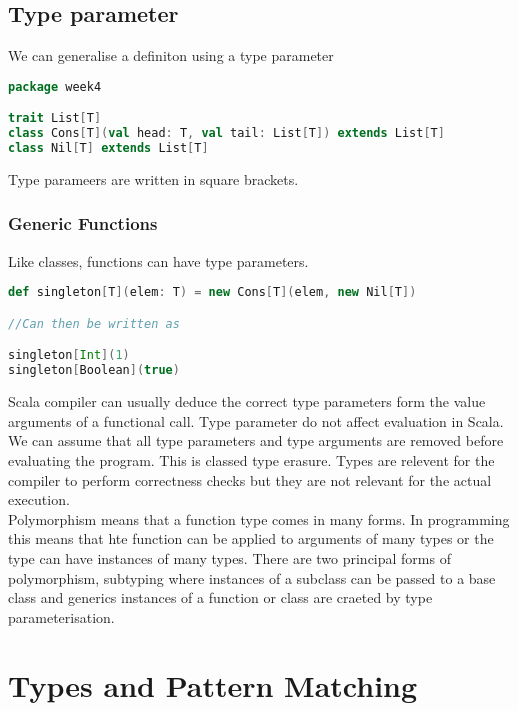 \documentclass[10pt, a4paper]{report}
\begin{document}
\section{Type parameter}

We can generalise a definiton using a type parameter

\begin{lstlisting}[language=scala]
package week4

trait List[T]
class Cons[T](val head: T, val tail: List[T]) extends List[T]
class Nil[T] extends List[T]

\end{lstlisting}

Type parameers are written in square brackets.

\subsection{Generic Functions}

Like classes, functions can have type parameters. 

\begin{lstlisting}[language=scala]
def singleton[T](elem: T) = new Cons[T](elem, new Nil[T])

//Can then be written as

singleton[Int](1)
singleton[Boolean](true)

\end{lstlisting}

Scala compiler can usually deduce the correct type parameters form the value arguments of a functional call. Type parameter do not affect evaluation in Scala. We can assume that all type parameters and type arguments are removed before evaluating the program. This is classed type erasure. Types are relevent for the compiler to perform correctness checks but they are not relevant for the actual execution.\\

Polymorphism means that a function type comes in many forms. In programming this means that hte function can be applied to arguments of many types or the type can have instances of many types. There are two principal forms of polymorphism, subtyping where instances of a subclass can be passed to a base class and generics instances of a function or class are craeted by type parameterisation.

\chapter{Types and Pattern Matching}
\end{document}
